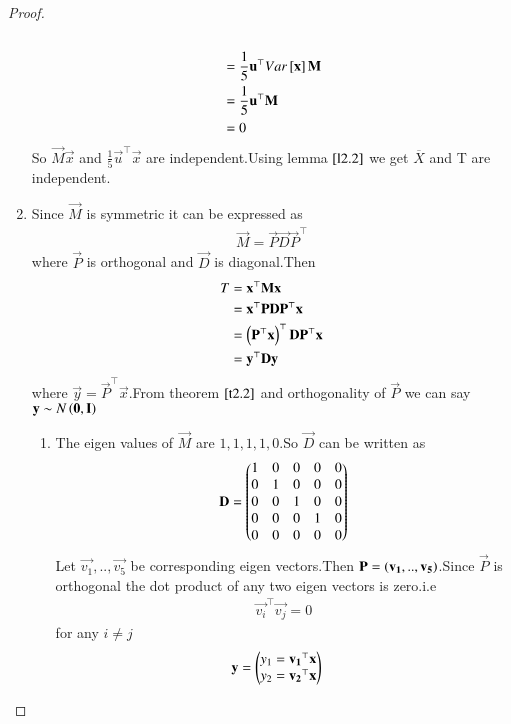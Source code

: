 \documentclass[journal,12pt,twocolumn]{IEEEtran}
\begin{document}
\begin{proof}
\begin{enumerate}
\begin{multline}
\end{multline}
\begin{align}
    &=\frac{1}{5}\mathbf{u}^{\top}Var{}\left[\mathbf{x}\right]\mathbf{M}\\
    &=\frac{1}{5}\mathbf{u}^{\top}\mathbf{M}\\
    &=0
\end{align}
So $\vec{M}\vec{x}$ and $\frac{1}{5}\vec{u}^{\top}\vec{x}$ are independent.Using lemma $\ref{l2.2}$ we get $\overline{X}$ and T are independent.
\item Since $\vec{M}$ is symmetric it can be expressed as
\begin{align}
    \vec{M}=\vec{P}\vec{D}\vec{P}^{\top}
\end{align}
where $\vec{P}$ is orthogonal and $\vec{D}$ is diagonal.Then
\begin{align}
    T&=\mathbf{x}^{\top}\mathbf{M}\mathbf{x}\\
    &=\mathbf{x}^{\top}\mathbf{P}\mathbf{D}\mathbf{P}^{\top}\mathbf{x}\\
    &=\left(\mathbf{P}^{\top}\mathbf{x}\right)^{\top}\mathbf{D}\mathbf{P}^{\top}\mathbf{x}\\
    &=\mathbf{y}^{\top}\mathbf{D}\mathbf{y}
\end{align}
where $\vec{y}=\vec{P}^{\top}\vec{x}$.From theorem $\ref{t2.2}$ and orthogonality of $\vec{P}$ we can say
$\mathbf{y}\sim N\left(\mathbf{0},\mathbf{I}\right)$
\begin{enumerate}
    \item The eigen values of $\vec{M}$ are $1,1,1,1,0$.So $\vec{D}$ can be written as
    \begin{align}
        \mathbf{D}=\begin{pmatrix}1&0&0&0&0\\
                       0&1&0&0&0\\
                       0&0&1&0&0\\
                       0&0&0&1&0\\
                       0&0&0&0&0\end{pmatrix}
    \end{align}
    Let $\vec{v_1},..,\vec{v_5}$ be corresponding eigen vectors.Then $\mathbf{P}=\left(\mathbf{v_1},..,\mathbf{v_5}\right)$.Since $\vec{P}$ is orthogonal the dot product of any two eigen vectors is zero.i.e
    \begin{align}
        \vec{v_i}^{\top}\vec{v_j}=0 \label{ind}
    \end{align}
    for any $i\neq j$
    \begin{align}
        \mathbf{y}&=\begin{pmatrix}y_1=\mathbf{v_1}^{\top}\mathbf{x}\\
                       y_2=\mathbf{v_2}^{\top}\mathbf{x}\\
\end{pmatrix}
\end{align}
\end{enumerate}
\end{enumerate}
\end{proof}
\end{document}
